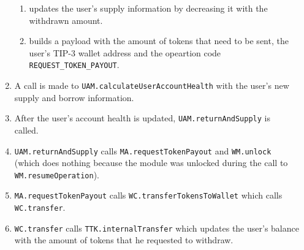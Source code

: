 \begin{enumerate}
  \begin{enumerate}[label*=\arabic*.]
    \item updates the user's supply information by decreasing it with the withdrawn amount.
    \item builds a payload with the amount of tokens that need to be sent, the user's TIP-3 wallet address and the opeartion code \\\verb|REQUEST_TOKEN_PAYOUT|.
  \end{enumerate}
  \item A call is made to \verb|UAM.calculateUserAccountHealth| with the user's new supply and borrow information.
  \item After the user's account health is updated, \verb|UAM.returnAndSupply| is \\called.
  \item \verb|UAM.returnAndSupply| calls \verb|MA.requestTokenPayout| and \verb|WM.unlock| \\(which does nothing because the module was unlocked during the call to \verb|WM.resumeOperation|).
  \item \verb|MA.requestTokenPayout| calls \verb|WC.transferTokensToWallet| which calls \verb|WC.transfer|.
  \item \verb|WC.transfer| calls \verb|TTK.internalTransfer| which updates the user's balance with the amount of tokens that he requested to withdraw.
\end{enumerate}

